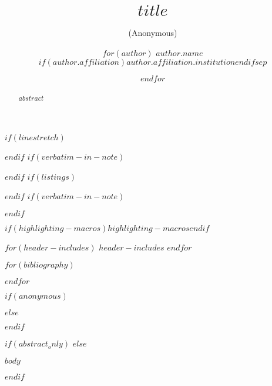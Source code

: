 \usepackage[dvipsnames,table]{xcolor}
\usepackage{usenix}
\usepackage{amsmath}
\usepackage{calc}
\usepackage{printlen}
\usepackage{textcomp} %
\usepackage{cleveref}
\usepackage{physics}
\usepackage{enumitem}
\usepackage{longtable}
\usepackage{booktabs}
\usepackage{array}
\usepackage{relsize}
\usepackage{etoolbox}
\usepackage{csquotes}
\usepackage{bookmark}
\usepackage{svg}
\usepackage[normalem]{ulem}
$if(linestretch)$\usepackage{setspace}$endif$
$if(verbatim-in-note)$\usepackage{fancyvrb}$endif$
$if(listings)$\usepackage{listings}$endif$
$if(verbatim-in-note)$\usepackage{fancyvrb}$endif$

$if(highlighting-macros)$$highlighting-macros$$endif$



\usepackage{graphicx}

\pdfstringdefDisableCommands{\renewcommand{\sout}{}}

\providecommand{\tightlist}{}

$for(header-includes)$
$header-includes$
$endfor$

\newcommand{\bibliofont}{\footnotesize}


\RequirePackage[
  datamodel=acmdatamodel,
  style=acmnumeric, %
]{biblatex}
$for(bibliography)$

$endfor$

\date{}

\title{\Large \textbf{$title$}}

$if(anonymous)$
\author{(Anonymous)}
$else$
\author{
$for(author)$
{\textrm{$author.name$}}\\
$if(author.affiliation)$$author.affiliation.institution$$endif$$sep$
\and
$endfor$
}
$endif$



\maketitle

\begin{abstract}
$abstract$
\end{abstract}

$if(abstract_only)$
$else$

$body$

$endif$


